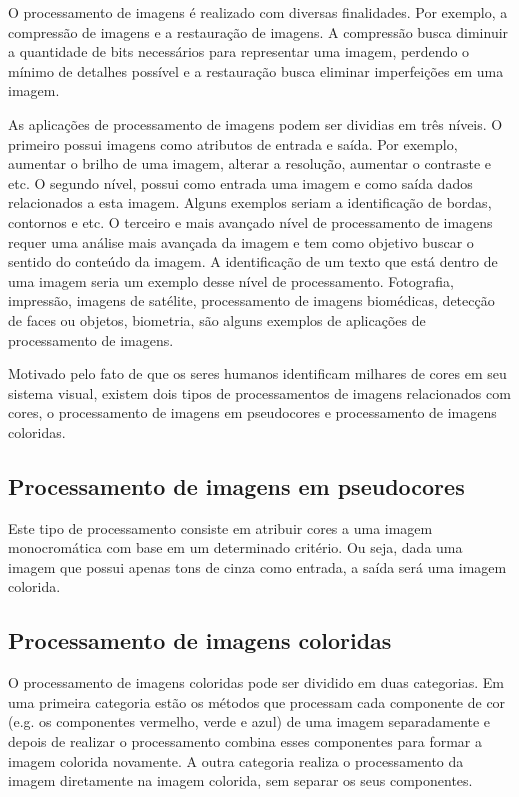 \documentclass[	12pt, Times, openright, twoside, a4paper, english, brazil]{abntex2}
\begin{document}
O processamento de imagens é realizado com diversas finalidades. Por exemplo, a compressão de imagens e a restauração de imagens. A compressão busca diminuir a quantidade de bits necessários para representar uma imagem, perdendo o mínimo de detalhes possível e a restauração busca eliminar imperfeições em uma imagem. 

As aplicações de processamento de imagens podem ser dividias em três níveis. O primeiro possui imagens como atributos de entrada e saída. Por exemplo, aumentar o brilho de uma imagem, alterar a resolução, aumentar o contraste e etc. O segundo nível, possui como entrada uma imagem e como saída dados relacionados a esta imagem. Alguns exemplos seriam a identificação de bordas, contornos e etc. O terceiro e mais avançado nível de processamento de imagens requer uma análise mais avançada da imagem e tem como objetivo buscar o sentido do conteúdo da imagem. A identificação de um texto que está dentro de uma imagem seria um exemplo desse nível de processamento. Fotografia, impressão, imagens de satélite, processamento de imagens biomédicas, detecção de faces ou objetos, biometria, são alguns exemplos de aplicações de processamento de imagens.

Motivado pelo fato de que os seres humanos identificam milhares de cores em seu sistema visual, existem dois tipos de processamentos de imagens relacionados com cores, o processamento de imagens em pseudocores e processamento de imagens coloridas.

\subsection{Processamento de imagens em pseudocores}
Este tipo de processamento consiste em atribuir cores a uma imagem monocromática com base em um determinado critério. Ou seja, dada uma imagem que possui apenas tons de cinza como entrada, a saída será uma imagem colorida.

\subsection{Processamento de imagens coloridas}

O processamento de imagens coloridas pode ser dividido em duas categorias. Em uma primeira categoria estão os métodos que processam cada componente de cor (e.g. os componentes vermelho, verde e azul) de uma imagem separadamente e depois de realizar o processamento combina esses componentes para formar a imagem colorida novamente. A outra categoria realiza o processamento da imagem diretamente na imagem colorida, sem separar os seus componentes.
\end{document}

